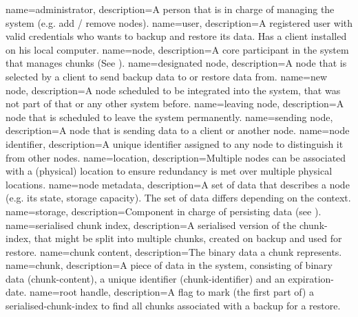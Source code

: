 {
    name={administrator},
    description={A person that is in charge of managing the system (e.g. add / remove nodes).}
}
{
    name={user},
    description={A registered user with valid credentials who wants to backup and restore its data. Has a client installed on his local computer.}
}
{
    name={node},
    description={A core participant in the system that manages \glspl{chunk} (See ).}
}
{
    name={designated node},
    description={A \gls{node} that is selected by a \gls{client} to send backup data to or restore data from.}
}
{
    name={new node},
    description={A \gls{node} scheduled to be integrated into the system, that was not part of that or any other system before.}
}
{
    name={leaving node},
    description={A \gls{node} that is scheduled to leave the system permanently.}
}
{
    name={sending node},
    description={A \gls{node} that is sending data to a client or another node.}
}
{
    name={node identifier},
    description={A unique identifier assigned to any node to distinguish it from other \glspl{node}.}
}
{
    name={location},
    description={Multiple \glspl{node} can be associated with a (physical) location to ensure redundancy is met over multiple physical locations.}
}
{
    name={node metadata},
    description={A set of data that describes a \gls{node} (e.g. its state, storage capacity). The set of data differs depending on the context.}
}
{
    name={storage},
    description={Component in charge of persisting data (see ).}
}
{
    name={serialised chunk index},
    description={A serialised version of the \gls{chunk-index}, that might be split into multiple chunks, created on backup and used for restore.}
}
{
    name={chunk content},
    description={The binary data a chunk represents.}
}
{
    name={chunk},
    description={A piece of data in the system, consisting of binary data (\gls{chunk-content}), a unique identifier (\gls{chunk-identifier}) and an \gls{expiration-date}.}
}
{
    name={root handle},
    description={A flag to mark (the first part of) a \gls{serialised-chunk-index} to find all chunks associated with a backup for a restore.}
}

